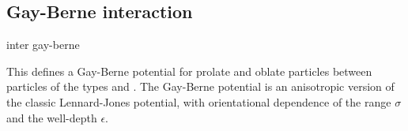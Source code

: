 \subsection{Gay-Berne interaction}

\begin{essyntax}
  inter   gay-berne
    
    \var{$\mu$} \var{$\nu$}
  \begin{features}
  \end{features}
\end{essyntax}
This defines a Gay-Berne potential for prolate and oblate particles between
particles of the types  and . The Gay-Berne potential is
an anisotropic version of the classic Lennard-Jones potential, with
orientational dependence of the range $\sigma$ and the well-depth $\epsilon$.

